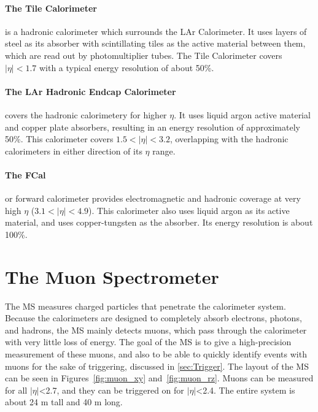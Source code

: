 \paragraph{The Tile Calorimeter} is a hadronic calorimeter which surrounds the LAr Calorimeter. It uses layers of steel as its absorber with scintillating tiles as the active material between them, which are read out by photomultiplier tubes. The Tile Calorimeter covers $|\eta| < 1.7$ with a typical energy resolution of about 50\%. 

\paragraph{The LAr Hadronic Endcap Calorimeter} covers the hadronic calorimetery for higher $\eta$. It uses liquid argon active material and copper plate absorbers, resulting in an energy resolution of approximately 50\%. This calorimeter covers $1.5 < |\eta| < 3.2$, overlapping with the hadronic calorimeters in either direction of its $\eta$ range. 

\paragraph{The FCal} or forward calorimeter provides electromagnetic and hadronic coverage at very high $\eta$ ($3.1 < |\eta| < 4.9$). This calorimeter also uses liquid argon as its active material, and uses copper-tungsten as the absorber. Its energy resolution is about 100\%.

\section{The Muon Spectrometer}
\label{sec:MS}

The \acf{MS} measures charged particles that penetrate the calorimeter system. Because the calorimeters are designed to completely absorb electrons, photons, and hadrons, the \ac{MS} mainly detects muons, which pass through the calorimeter with very little loss of energy. The goal of the \ac{MS} is to give a high-precision measurement of these muons, and also to be able to quickly identify events with muons for the sake of triggering, discussed in \autoref{sec:Trigger}. The layout of the \ac{MS} can be seen in Figures~\ref{fig:muon_xy} and~\ref{fig:muon_rz}. Muons can be measured for all $|\eta|$<2.7, and they can be triggered on for $|\eta|$<2.4. The entire system is about 24 m tall and 40 m long. 


